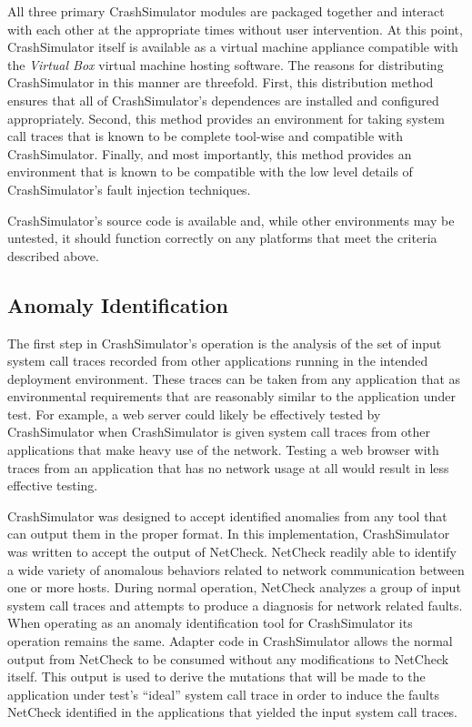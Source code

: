         All three primary CrashSimulator modules are packaged together and interact with each other at the appropriate
        times without user intervention. At this point, CrashSimulator itself is available as a virtual machine
        appliance compatible with the \emph{Virtual Box} virtual machine hosting software. The reasons for distributing
        CrashSimulator in this manner are threefold. First, this distribution method ensures that all of
        CrashSimulator's dependences are installed and configured appropriately. Second, this method provides an
        environment for taking system call traces that is known to be complete tool-wise and compatible with
        CrashSimulator. Finally, and most importantly, this method provides an environment that is known to be
        compatible with the low level details of CrashSimulator's fault injection techniques.

        CrashSimulator's source code is available and, while other environments may be untested, it should function
        correctly on any platforms that meet the criteria described above.

    \subsection{Anomaly Identification}

        The first step in CrashSimulator's operation is the analysis of the set of input system call traces recorded
        from other applications running in the intended deployment environment. These traces can be taken from any
        application that as environmental requirements that are reasonably similar to the application under test. For
        example, a web server could likely be effectively tested by CrashSimulator when CrashSimulator is given system
        call traces from other applications that make heavy use of the network. Testing a web browser with traces from
        an application that has no network usage at all would result in less effective testing.

        CrashSimulator was designed to accept identified anomalies from any tool that can output them in the proper
        format. In this implementation, CrashSimulator was written to accept the output of NetCheck. NetCheck readily
        able to identify a wide variety of anomalous behaviors related to network communication between one or more
        hosts. During normal operation, NetCheck analyzes a group of input system call traces and attempts to produce a
        diagnosis for network related faults. When operating as an anomaly identification tool for CrashSimulator its
        operation remains the same. Adapter code in CrashSimulator allows the normal output from NetCheck to be consumed
        without any modifications to NetCheck itself. This output is used to derive the mutations that will be made to
        the application under test's ``ideal'' system call trace in order to induce the faults NetCheck identified in
        the applications that yielded the input system call traces.

